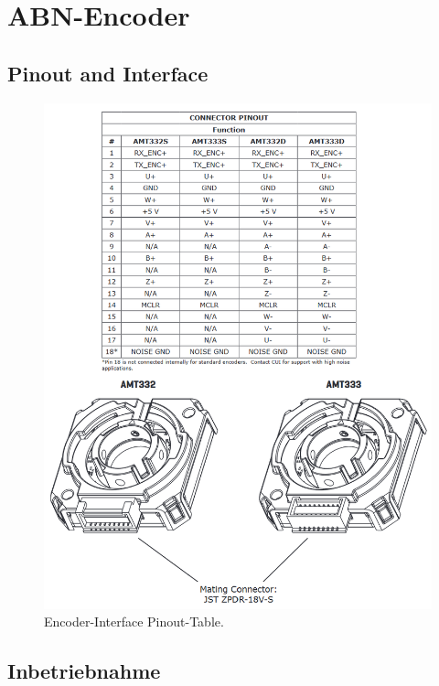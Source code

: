\section{ABN-Encoder}\label{Appendix:ABC_Ecoder}

\subsection{Pinout and Interface}

\begin{figure}[H]
	\centering
	\includegraphics[width=\textwidth]{graphics/Encoder_Interface}
	\caption{Encoder-Interface Pinout-Table.\cite[S.5]{cui_devices_cui_2019}}
	\label{fig:Encoder_Interface}
\end{figure}

\newpage

\subsection{Inbetriebnahme}

